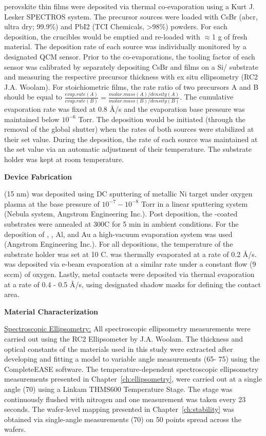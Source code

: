  perovskite thin films were deposited via thermal co-evaporation using a Kurt J. Lesker SPECTROS system. The precursor sources were loaded with CsBr (abcr, ultra dry; 99.9\%) and PbI2 (TCI Chemicals, >98\%) powders.
For each deposition, the crucibles would be emptied and re-loaded with $\approx$1 g of fresh material. The deposition rate of each source was individually monitored by a designated QCM sensor. Prior to the co-evaporations, the tooling factor of each sensor was calibrated by separately depositing CsBr and  films on a Si/ substrate and measuring the respective precursor thickness with ex situ ellipsometry (RC2 J.A. Woolam). For stoichiometric films, the rate ratio of two precursors A and B  should be equal to $\frac{evap. rate (A)}{evap.rate(B)}=\frac{molar.mass(A)/density(A)}{molar.mass(B)/density(B)}$. The cumulative evaporation rate was fixed at 0.8 \AA/s and the evaporation base pressure was maintained below $10^{-6}$ Torr. The deposition would be initiated (through the removal of the global shutter) when the rates of both sources were stabilized at their set value. During the deposition, the rate of each source was maintained at the set value via an automatic adjustment of their temperature. The substrate holder was kept at room temperature. 


\textbf{Device Fabrication}

 (15 nm) was deposited using DC sputtering of metallic Ni target under oxygen plasma at the base pressure of $10^{-7}-10^{-8}$ Torr in a linear sputtering system (Nebula system, Angstrom Engineering Inc.). Post deposition, the -coated substrates were annealed at 300\degree C for 5 min in ambient conditions. For the deposition of , , Al, and Au a high-vacuum evaporation system was used (Angstrom Engineering Inc.). For all depositions, the temperature of the substrate holder was set at 10 \degree C.  was thermally evaporated at a rate of 0.2 \AA/s.  was deposited via e-beam evaporation at a similar rate under a constant flow (9 sccm) of oxygen. Lastly, metal contacts were deposited via thermal evaporation at a rate of 0.4 - 0.5 \AA/s, using designated shadow masks for defining the contact area. 

\textbf{Material Characterization} 

\underline{Spectroscopic Ellipsometry:} All spectroscopic ellipsometry measurements were carried out using the RC2 Ellipsometer by J.A. Woolam. The thickness and optical constants of the materials used in this study were extracted after developing and fitting a model to variable angle measurements (65\degree - 75\degree) using the CompleteEASE software. The temperature-dependent spectroscopic ellipsometry measurements presented in Chapter~\ref{ch:ellipsometry}, were carried out at a single angle (70\degree) using a Linkam THMS600 Temperature Stage. The stage was continuously flushed with nitrogen and one measurement was taken every 23 seconds. The wafer-level mapping presented in Chapter~\ref{ch:stability} was obtained via single-angle measurements (70\degree) on 50 points spread across the wafers. 


